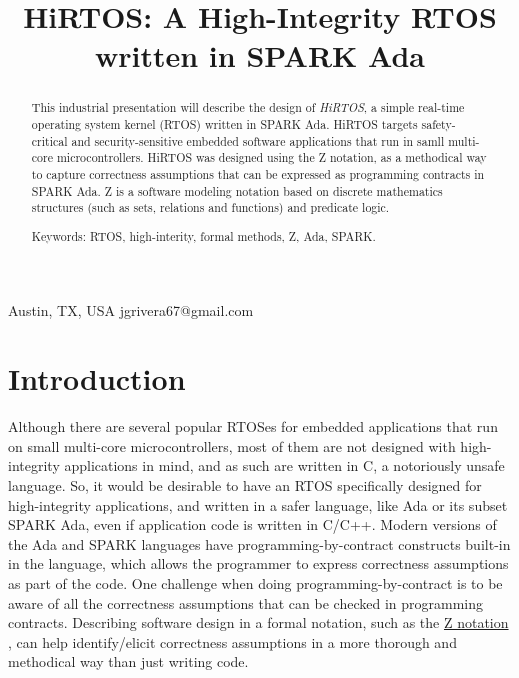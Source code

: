 \documentclass{AUJarticle}
\begin{document}
\title{HiRTOS: A High-Integrity RTOS written in SPARK Ada}

{Austin, TX, USA}
{jgrivera67@gmail.com}



\thispagestyle{plain}

\maketitle

\begin{abstract}

This industrial presentation will describe the design of \emph{HiRTOS}, a simple
real-time operating system kernel (RTOS) written in SPARK Ada. HiRTOS targets
safety-critical and security-sensitive embedded software applications that run
in samll multi-core microcontrollers. HiRTOS was designed using the Z notation,
as a methodical way to capture correctness assumptions that can be expressed
as programming contracts in SPARK Ada. Z is a software modeling notation based
on discrete mathematics structures (such as sets, relations and functions)
and predicate logic.

Keywords: RTOS, high-interity, formal methods, Z, Ada, SPARK.

\end{abstract}

\section{Introduction}

Although there are several popular RTOSes for embedded applications that run on small
multi-core microcontrollers, most of them are not designed with high-integrity applications
in mind, and as such are written in C, a notoriously unsafe language. So, it would be desirable
to have an RTOS specifically designed for high-integrity applications, and written in a safer
language, like Ada or its subset SPARK Ada, even if application code is written in C/C++.
Modern versions of the Ada and SPARK languages have programming-by-contract constructs built-in
in the language, which allows the programmer to express correctness assumptions as part of the
code. One challenge when doing programming-by-contract is to be aware of all the correctness
assumptions that can be checked in programming contracts. Describing software design in a formal
notation, such as the \href{http://en.wikipedia.org/wiki/Z_notation}{Z notation} \cite{Zrm, WayofZ},
can help identify/elicit correctness assumptions in a more thorough and methodical way than just
writing code.
\end{document}
